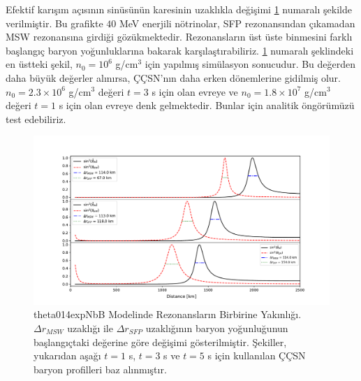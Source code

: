 Efektif karışım açısının sinüsünün karesinin uzaklıkla değişimi \ref{fig:theta014expNbB_sin2_thetaM_thetaEM_dist10MeV} numaralı şekilde verilmiştir. Bu grafikte $ 40 $ MeV enerjili nötrinolar, SFP rezonansından çıkamadan MSW rezonansına girdiği gözükmektedir. Rezonansların üst üste binmesini farklı başlangıç baryon yoğunluklarına bakarak karşılaştırabiliriz. \ref{fig:theta014expNbB_sin2_thetaM_thetaEM_dist10MeV} numaralı şeklindeki en üstteki şekil, $ n_{0}=10^{6} $ g/cm$ ^{3} $ için yapılmış simülasyon sonucudur. Bu değerden daha büyük değerler alınırsa, ÇÇSN'nın daha erken dönemlerine gidilmiş olur. $ n_{0}=2.3\times 10^{6} $ g/cm$ ^{3} $ değeri $ t=3 $ s için olan evreye ve $ n_{0}=1.8\times 10^{7} $ g/cm$ ^{3} $ değeri $ t=1 $ s için olan evreye denk gelmektedir. Bunlar için analitik öngörümüzü test edebiliriz.

\begin{figure}[hbt!]
    \centering
    \includegraphics[width=\textwidth]{figures/widthCompare3x1_40MeV_IH_t135s.pdf}
    \caption[theta014expNbB Modelinde Rezonansların Birbirine Yakınlığı]{theta014expNbB Modelinde Rezonansların Birbirine Yakınlığı. $ \Delta r_{MSW} $ uzaklığı ile $ \Delta r_{SFP} $ uzaklığının baryon yoğunluğunun başlangıçtaki değerine göre değişimi gösterilmiştir. Şekiller, yukarıdan aşağı $ t=1 $ s, $ t=3 $ s ve $ t=5 $ s için kullanılan ÇÇSN baryon profilleri baz alınmıştır.}
    \label{fig:theta014expNbB_sin2_thetaM_thetaEM_dist10MeV}
\end{figure}

